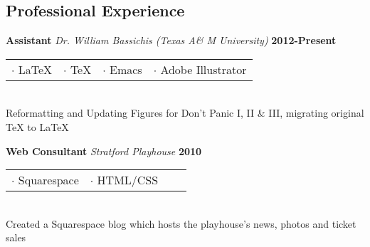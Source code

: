 \documentclass[margin,line]{res}
\begin{document}
{\begin{resume}
\vspace*{.25in}
{\color{WildStrawberry}
  \section{\sc Professional Experience}}
{\bf Assistant} {\em Dr. William Bassichis (Texas A\& M University)} \hfill {\bf 2012-Present} \
\\
\begin{tabular}{l l l l}
  $\cdot$ \LaTeX{} & $\cdot$ \TeX{} & $\cdot$ Emacs & $\cdot$ Adobe Illustrator
\end{tabular}
\\
\hspace*{.14pt}
Reformatting and Updating Figures for Don't Panic I, II \& III,
migrating original \TeX{} to \LaTeX{}




{\bf Web Consultant} {\em Stratford Playhouse} \hfill {\bf 2010} \
\\
\begin{tabular}{l l l l}
  $\cdot$ Squarespace  & $\cdot$ HTML/CSS
\end{tabular}
\\
\hspace*{.14pt}
Created a Squarespace blog which hosts the playhouse's news,
photos and ticket sales
\vspace{-.13in}



\end{resume}}
\end{document}
